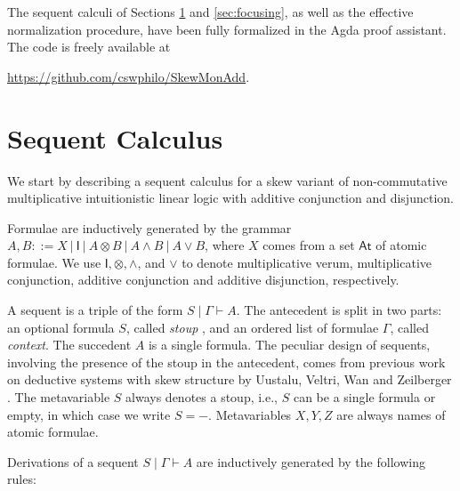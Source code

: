 \documentclass[submission,copyright,creativecommons]{eptcs}
\theoremstyle{definition}
\newcommand{\ot}{\otimes}
\newcommand{\I}{\mathsf{I}}
\begin{document}
The sequent calculi of Sections \ref{sec:sequent-calculus} and \ref{sec:focusing}, as well as the effective normalization procedure, have been fully formalized in the Agda proof assistant. The code is freely available at
\begin{center}
  \url{https://github.com/cswphilo/SkewMonAdd}.
\end{center}

\section{Sequent Calculus}\label{sec:sequent-calculus}
We start by describing a sequent calculus for a skew variant of non-commutative multiplicative intuitionistic linear logic with additive conjunction and disjunction.

Formulae are inductively generated by the grammar $A,B ::= X \ | \ \I \ | \ A \ot B \ | \ A \land B \ | \ A \lor B$, where $X$ comes from a set $\mathsf{At}$ of atomic formulae. 
We use $\I , \ot , \land$, and $\lor$ to denote multiplicative verum, multiplicative conjunction, additive conjunction and additive disjunction, respectively.

A sequent is a triple of the form $S \mid \Gamma \vdash A$.
The antecedent is split in two parts: an optional formula $S$, called \emph{stoup} \cite{girard:constructive:91}, and an ordered list of formulae $\Gamma$, called \emph{context}.
The succedent $A$ is a single formula.
The peculiar design of sequents, involving the presence of the stoup in the antecedent, comes from previous work on deductive systems with skew structure by Uustalu, Veltri, Wan and Zeilberger \cite{uustalu:sequent:2021,uustalu:proof:nodate,uustalu:deductive:nodate,veltri:coherence:2021,UVW:protsn}.
The metavariable $S$ always denotes a stoup, i.e., $S$ can be a single formula or empty, in which case we write $S = {-}$. Metavariables $X,Y,Z$ are always names of atomic formulae.

Derivations of a sequent $S \mid \Gamma \vdash A$ are inductively generated by the following rules:
\end{document}
